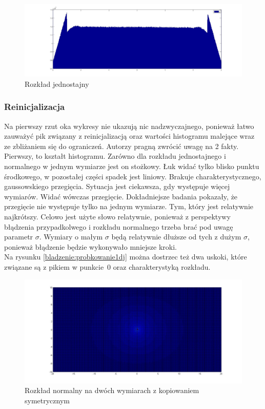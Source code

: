 \documentclass{mini}
\begin{document}
\begin{figure}[H]
\centering
\includegraphics[width=\textwidth]{p_j_100M_1__3_3}
\caption{Rozkład jednostajny}
\label{bladzenie:rzutowanie1dj}
\end{figure}

\subsubsection*{Reinicjalizacja}
Na pierwszy rzut oka wykresy nie ukazują nic nadzwyczajnego, ponieważ łatwo zauważyć pik związany z reinicjalizacją oraz wartości histogramu malejące wraz ze zbliżaniem się do ograniczeń. Autorzy pragną zwrócić uwagę na 2 fakty. Pierwszy, to kształt histogramu. Zarówno dla rozkładu jednostajnego i normalnego w jednym wymiarze jest on stożkowy. Łuk widać tylko blisko punktu środkowego, w pozostałej części spadek jest liniowy. Brakuje charakterystycznego, gaussowskiego przegięcia. Sytuacja jest ciekawsza, gdy występuje więcej wymiarów. Widać wówczas przegięcie. Dokładniejsze badania pokazały, że przegięcie nie występuje tylko na jednym wymiarze. Tym, który jest relatywnie najkrótszy. Celowo jest użyte słowo relatywnie, ponieważ z perspektywy błądzenia przypadkolwego i rozkładu normalnego trzeba brać pod uwagę parametr $\sigma$. Wymiary o małym $\sigma$ będą relatywnie dłuższe od tych z dużym $\sigma$, ponieważ błądzenie będzie wykonywało mniejsze kroki.\\
Na rysunku \ref{bladzenie:probkowanie1dj} można dostrzec też dwa uskoki, które związane są z pikiem w punkcie~$0$ oraz charakterystyką rozkładu.

\begin{figure}[H]
\centering
\includegraphics[width=\textwidth]{ri_n_10M_2__20_20__10_10_4}
\caption{Rozkład normalny na dwóch wymiarach z kopiowaniem symetrycznym}
\end{figure}
\end{document}

